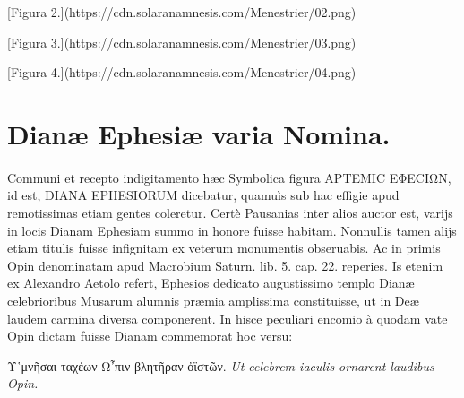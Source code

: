 \documentclass[a4paper, 11pt, oneside, polutonikogreek, latin]{article}
\begin{document}
[Figura 2.](https://cdn.solaranamnesis.com/Menestrier/02.png)

[Figura 3.](https://cdn.solaranamnesis.com/Menestrier/03.png)

[Figura 4.](https://cdn.solaranamnesis.com/Menestrier/04.png)
\clearpage
\section{Dianæ Ephesiæ varia Nomina.}
\paragraph{}
Communi et recepto indigitamento hæc Symbolica figura ΑΡΤΕΜΙC ΕΦΕCΙΩΝ, id est, DIANA EPHESIORUM dicebatur, quamuìs sub hac effigie apud remotissimas etiam gentes coleretur. Certè Pausanias inter alios auctor est, varijs in locis Dianam Ephesiam summo in honore fuisse habitam. Nonnullis tamen alijs etiam titulis fuisse infignitam ex veterum monumentis obseruabis. Ac in primis Opin denominatam apud Macrobium Saturn. lib. 5. cap. 22. reperies. Is etenim ex Alexandro Aetolo refert, Ephesios dedicato augustissimo templo Dianæ celebrioribus Musarum alumnis præmia amplissima constituisse, ut in Deæ laudem carmina diversa componerent. In hisce peculiari encomio à quodam vate Opin dictam fuisse Dianam commemorat hoc versu:

Υ῾μνῆσαι ταχέων Ω῏πιν βλητῆραν ὀϊστῶν.
\emph{Ut celebrem iaculis ornarent laudibus Opin.}
 
\end{document}
